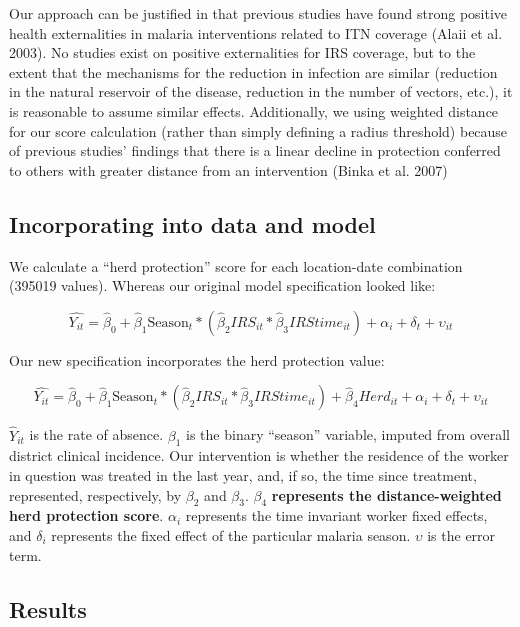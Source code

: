 \documentclass[]{article}
\begin{document}
Our approach can be justified in that previous studies have found strong
positive health externalities in malaria interventions related to ITN
coverage (Alaii et al. 2003). No studies exist on positive externalities
for IRS coverage, but to the extent that the mechanisms for the
reduction in infection are similar (reduction in the natural reservoir
of the disease, reduction in the number of vectors, etc.), it is
reasonable to assume similar effects. Additionally, we using weighted
distance for our score calculation (rather than simply defining a radius
threshold) because of previous studies' findings that there is a linear
decline in protection conferred to others with greater distance from an
intervention (Binka et al. 2007)

\subsection{Incorporating into data and
model}\label{incorporating-into-data-and-model}

We calculate a ``herd protection'' score for each location-date
combination (395019 values). Whereas our original model specification
looked like:

\[
\hat{Y_{it}} = \hat{\beta}_{0} +  \hat{\beta}_{1}\text{Season}_{t} * (\hat{\beta}_2{IRS_{it}}*\hat{\beta}_3{IRStime_{it}}) + \alpha_i + \delta_t + \upsilon_{it}
\]

Our new specification incorporates the herd protection value:

\[
\hat{Y_{it}} = \hat{\beta}_{0} +  \hat{\beta}_{1}\text{Season}_{t} * (\hat{\beta}_2{IRS_{it}}*\hat{\beta}_3{IRStime_{it}}) +  \hat{\beta}_4{Herd_{it}} +  \alpha_i + \delta_t + \upsilon_{it}
\]

\(\hat{Y}_{it}\) is the rate of absence. \(\beta_{1}\) is the binary
``season'' variable, imputed from overall district clinical incidence.
Our intervention is whether the residence of the worker in question was
treated in the last year, and, if so, the time since treatment,
represented, respectively, by \(\beta_{2}\) and \(\beta_{3}\).
\(\beta_{4}\) \textbf{represents the distance-weighted herd protection
score}. \(\alpha_i\) represents the time invariant worker fixed effects,
and \(\delta_i\) represents the fixed effect of the particular malaria
season. \(\upsilon\) is the error term.

\newpage

\subsection{Results}\label{results}
\end{document}
